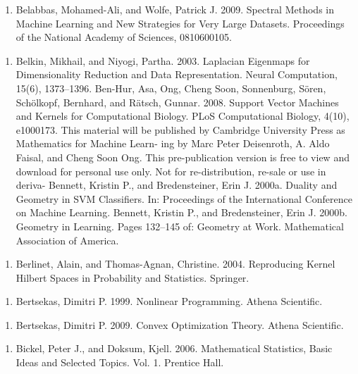 \begin{enumerate}
\item Belabbas, Mohamed-Ali, and Wolfe, Patrick J. 2009. Spectral Methods in Machine Learning and New Strategies for Very Large Datasets. Proceedings of the National Academy of Sciences, 0810600105.
\end{enumerate}

\begin{enumerate}
\item Belkin, Mikhail, and Niyogi, Partha. 2003. Laplacian Eigenmaps for Dimensionality Reduction and Data Representation. Neural Computation, 15(6), 1373–1396. Ben-Hur, Asa, Ong, Cheng Soon, Sonnenburg, Sören, Schölkopf, Bernhard, and Rätsch, Gunnar. 2008. Support Vector Machines and Kernels for Computational Biology. PLoS Computational Biology, 4(10), e1000173. This material will be published by Cambridge University Press as Mathematics for Machine Learn- ing by Marc Peter Deisenroth, A. Aldo Faisal, and Cheng Soon Ong. This pre-publication version is free to view and download for personal use only. Not for re-distribution, re-sale or use in deriva- Bennett, Kristin P., and Bredensteiner, Erin J. 2000a. Duality and Geometry in SVM Classiﬁers. In: Proceedings of the International Conference on Machine Learning. Bennett, Kristin P., and Bredensteiner, Erin J. 2000b. Geometry in Learning. Pages 132–145 of: Geometry at Work. Mathematical Association of America.
\end{enumerate}

\begin{enumerate}
\item Berlinet, Alain, and Thomas-Agnan, Christine. 2004. Reproducing Kernel Hilbert Spaces in Probability and Statistics. Springer.
\end{enumerate}

\begin{enumerate}
\item Bertsekas, Dimitri P. 1999. Nonlinear Programming. Athena Scientiﬁc.
\end{enumerate}

\begin{enumerate}
\item Bertsekas, Dimitri P. 2009. Convex Optimization Theory. Athena Scientiﬁc.
\end{enumerate}

\begin{enumerate}
\item Bickel, Peter J., and Doksum, Kjell. 2006. Mathematical Statistics, Basic Ideas and Selected Topics. Vol. 1. Prentice Hall.
\end{enumerate}

